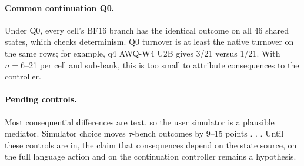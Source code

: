 \paragraph{Common continuation Q0.} Under Q0, every cell's BF16 branch has the identical outcome on all 46 shared states, which checks determinism. Q0 turnover is at least the native turnover on the same rows; for example, q4 AWQ-W4 U2B gives 3/21 versus 1/21. With $n=6$--21 per cell and sub-bank, this is too small to attribute consequences to the controller. %

\paragraph{Pending controls.} Most consequential differences are text, so the user simulator is a plausible mediator. Simulator choice moves $\tau$-bench outcomes by 9--15 points \citep{seshadri2026lost,jain2026userproxybench}. %
. . Until these controls are in, the claim that consequences depend on the state source, on the full language action and on the continuation controller remains a hypothesis.
